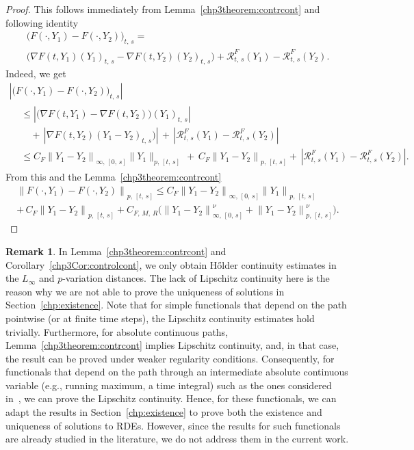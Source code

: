 \documentclass[10pt]{amsart}
\theoremstyle{definition}\newtheorem{defi}[theo]{Definition}\newtheorem{rema}[theo]{Remark}\newtheorem{exam}[theo]{Example}\newtheorem{exem}[theo]{Example}\newtheorem{nota}[theo]{Notation}
\newcommand{\calR}{\mathcal{R}}
\begin{document}
\begin{proof}
This follows immediately from Lemma~\ref{chp3theorem:contrcont} and following identity
\begin{multline*}
\big(F(\cdot,Y_1)-F(\cdot, Y_2)\big)_{t,\,s}=\\
\big(\nabla F(t,Y_1)(Y_1)_{t,\,s}-\nabla F(t, Y_2)(Y_2)_{t,\,s}\big)
+\calR^{F}_{t,\,s}(Y_1)-\calR^{F}_{t,\,s}(Y_2).
\end{multline*}
Indeed, we get
\begin{multline*}
\left|\big(F(\cdot,Y_1)-F(\cdot, Y_2)\big)_{t,\,s}\right|\\
\begin{aligned}
&\leq \left|\big(\nabla F(t,Y_1)-\nabla F(t, Y_2)\big)(Y_1)_{t,\,s}\right|\,\\
&\quad+\,\left|\nabla F(t, Y_2)(Y_1-Y_2)_{t,\,s})\right|\, +\,\left|\calR^{F}_{t,\,s}(Y_1)-\calR^{F}_{t,\,s}(Y_2)\right|\\
&\leq C_F \left\|Y_1-Y_2\right\|_{\infty,\,[0, \,s]} \|Y_1\|_{p,\,[t,\,s]}\,+\, C_F \left\|Y_1-Y_2\right\|_{p,\,[t,\,s]} +\,\left|\calR^{F}_{t,\,s}(Y_1)-\calR^{F}_{t,\,s}(Y_2)\right|.
\end{aligned}
\end{multline*}
From this and the Lemma~\ref{chp3theorem:contrcont}
\begin{multline*}
\left\|F(\cdot,Y_1)-F(\cdot, Y_2)\right\|_{p,\,[t,\,s]}
\leq C_F \left\|Y_1-Y_2\right\|_{\infty,\,[0,\,s]} \left\|Y_1\right\|_{p,\,[t,\,s]}\\
+\, C_F \left\|Y_1-Y_2\right\|_{p,\,[t,\,s]}
+ C_{F,\,M,\,R} \Big(\left\|Y_1-Y_2\right\|_{\infty,\,[0,\,s]}^{\nu}+\left\|Y_1-Y_2\right\|_{p,\,[t,\,s]}^{\nu}\Big).
\end{multline*}
\end{proof}


\begin{rema}\label{remark:Lipcontrol}
In Lemma~\ref{chp3theorem:contrcont} and Corollary~\ref{chp3Cor:controlcont}, we only obtain H\H older continuity estimates in the $L_{\infty}$ and $p$-variation distances. The lack of Lipschitz continuity here is the reason why we are not able to prove the uniqueness of solutions in Section~\ref{chp:existence}. Note that for simple functionals that depend on the path pointwise (or at finite time steps), the Lipschitz continuity estimates hold trivially. Furthermore, for absolute continuous paths, Lemma~\ref{chp3theorem:contrcont} implies Lipschitz continuity, and, in that case, the result can be proved under weaker regularity conditions. Consequently, for functionals that depend on the path through an intermediate absolute continuous variable (e.g., running maximum, a time integral) such as the ones considered in~\cite{aida2019}, we can prove the Lipschitz continuity. Hence, for these functionals, we can adapt the results in Section~\ref{chp:existence} to prove both the existence and uniqueness of solutions to RDEs. However, since the results for such functionals are already studied in the literature, we do not address them in the current work.
\end{rema}
\end{document}

